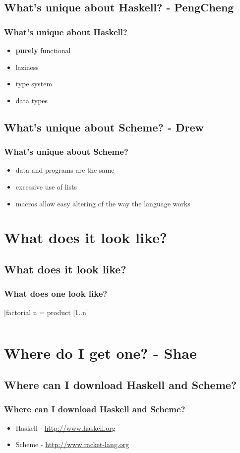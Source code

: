 \documentclass[xcolor=pdftex,dvipsnames,table]{beamer}
\begin{document}
\subsection{What's unique about Haskell? - PengCheng}
\begin{frame}
  \frametitle{What's unique about Haskell?}
  \begin{itemize}
  \item \textbf{purely} functional
  \item laziness
  \item type system
  \item data types
  \end{itemize}
\end{frame}

\subsection{What's unique about Scheme? - Drew}
\begin{frame}
  \frametitle{What's unique about Scheme?}
  \begin{itemize}
  \item data and programs are the same
  \item excessive use of lists
  \item macros allow easy altering of the way the language works
  \end{itemize}
\end{frame}

\section{What does it look like?}
\subsection{What does it look like?}
\begin{frame}
  \frametitle{What does one look like?}
  |factorial n = product [1..n]|
  \inputminted{scheme}{fac.scm}
\end{frame}

\section{Where do I get one? - Shae}
\subsection{Where can I download Haskell and Scheme?}
\begin{frame}
  \frametitle{Where can I download Haskell and Scheme?}
  \begin{itemize}
  \item Haskell - \url{http://www.haskell.org}
  \item Scheme - \url{http://www.racket-lang.org}
  \end{itemize}
\end{frame}
\end{document}
